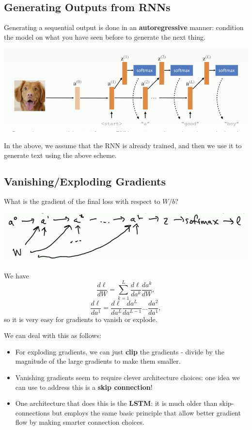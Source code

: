 \documentclass[11pt]{scrartcl}
\begin{document}
\subsection{Generating Outputs from RNNs}
Generating a sequential output is done in an \textbf{autoregressive} manner: condition the model on what you have seen before to generate the next thing. 
\begin{center}
\includegraphics[scale=0.8]{images/autoreg.png}
\end{center}
\begin{remark} In the above, we assume that the RNN is already trained, and then we use it to generate text using the above scheme. 
\end{remark}

\subsection{Vanishing/Exploding Gradients}
What is the gradient of the final loss with respect to $W/b$?
\begin{center}
\includegraphics[scale=0.8]{images/grad.png}
\end{center}

We have 
$$\frac{d\ell}{dW} = \sum_{k=1}
^L \frac{d\ell}{da^k} \frac{da^k}{dW},$$
$$\frac{d\ell}{da^{1}} = \frac{d\ell}{da^L} \frac{da^L}{da^{L-1}} \dots \frac{da^2}{da^1},$$
so it is very easy for gradients to vanish or explode.

We can deal with this as follows:
\begin{itemize}
\item For exploding gradients, we can just \textbf{clip} the gradients - divide by the magnitude of the large gradients to make them smaller.
\item Vanishing gradients seem to require clever architecture choices: one idea we can use to address this is a \textbf{skip connection}!  
\item One architecture that does this is the \textbf{LSTM}: it is much older than skip-connections but employs the same basic principle that allow better gradient flow by making smarter connection choices. 
\end{itemize}
\end{document}
